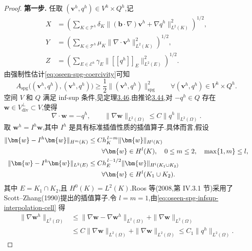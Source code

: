 \begin{proof}
\noindent\textbf{第一步.} 任取 $(\bm{v}^h,q^h)\in V^h\times Q^h$,记
\begin{equation*}
\begin{aligned}
 X&=\left(\sum_{K\in\mathcal{T}^h}\delta_K
    \|(\bm{b}\cdot\nabla)\bm{v}^h+\nabla q^h\|_{L^2(K)}^2\right)^{1/2},\\
 Y&=\left(\sum_{K\in\mathcal{T}^h}\mu_K
    \|\nabla\cdot\bm{v}^h\|_{L^2(K)}^2\right)^{1/2},\\
 Z&=\left(\sum_{E\in\mathcal{E}^h}\gamma_E
    \|[\![q^h]\!]_E\|_{L^2(E)}^2\right)^{1/2}.
\end{aligned}
\end{equation*}
由强制性估计\cref{eq:oseen-spg-coercivity}可知
\begin{equation}\label{eq:oseen-spg-infsup-coercivity}
 A_{\mathrm{spg}}\bigl((\bm{v}^h,q^h),(\bm{v}^h,q^h)\bigr)
  \ge\frac12\|(\bm{v}^h,q^h)\|_{\mathrm{spg}}^2
  \qquad\forall(\bm{v}^h,q^h)\in V^h\times Q^h.
\end{equation}
空间 $V$ 和 $Q$ 满足 inf-sup 条件,见定理\hyperref[thm:infsup-v-q]{3.46}.由推论\hyperref[cor:each-pressure-is-divergence]{3.44},对 $-q^h\in Q$ 存在 $\bm{w}\in V_{\mathrm{div}}^\perp\subset V$,使得
\[
  \nabla\cdot\bm{w}=-q^h,
  \qquad
  \|\nabla\bm{w}\|_{L^2(\Omega)}
       \le C\|q^h\|_{L^2(\Omega)}.
\]
取 $\bm{w}^h=I^h\bm{w}$,其中 $I^h$ 是具有标准插值性质的插值算子.具体而言,假设
\begin{align}
 \|\bm{w}-I^h\bm{w}\|_{H^m(K)}
  &\le C h_K^{\,l-m}\|\bm{w}\|_{H^l(K)}
    \label{eq:oseen-spg-infsup-interpolation-cell}\\
  &\qquad\forall\bm{w}\in H^l(K),\quad 0\le m\le2,\quad
       \max\{1,m\}\le l,\notag\\
 \|\bm{w}-I^h\bm{w}\|_{L^2(E)}
  &\le C h_E^{\,l-1/2}\|\bm{w}\|_{H^l(K_1\cup K_2)}
    \label{eq:oseen-spg-infsup-interpolation-face}\\
  &\qquad\forall\bm{w}\in H^l(K_1\cup K_2).\notag
\end{align}
其中 $E=K_1\cap K_2$,且 $H^0(K)=L^2(K)$.Roos 等(2008,第 IV.3.1 节)采用了 Scott--Zhang(1990)提出的插值算子.令 $l=m=1$,由\cref{eq:oseen-spg-infsup-interpolation-cell} 得
\begin{equation}\label{eq:oseen-spg-infsup-interpolant-gradient}
\begin{aligned}
 \|\nabla\bm{w}^h\|_{L^2(\Omega)}
 &\le \|\nabla\bm{w}-\nabla\bm{w}^h\|_{L^2(\Omega)}
       +\|\nabla\bm{w}\|_{L^2(\Omega)}\\
 &\le C\|\nabla\bm{w}\|_{L^2(\Omega)}
       +\|\nabla\bm{w}\|_{L^2(\Omega)}
 \le C_1\|q^h\|_{L^2(\Omega)}.
\end{aligned}
\end{equation}


\end{proof}
